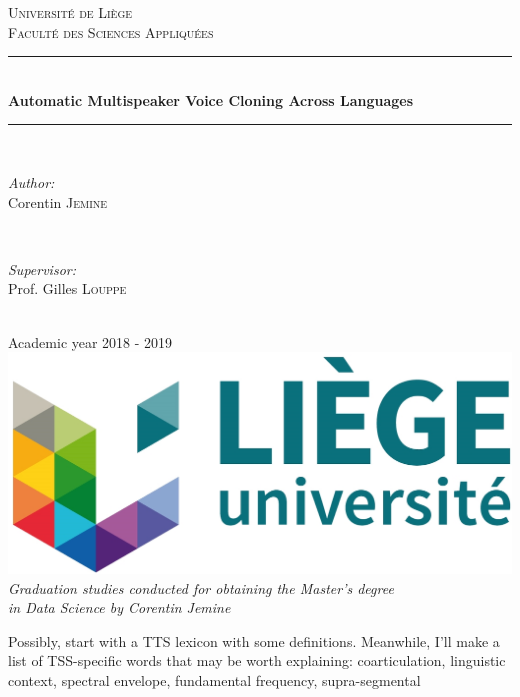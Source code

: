 \documentclass[a4paper, oneside]{article}
\begin{document}
\begin{titlepage}
	\newcommand{\HRule}{\rule{\linewidth}{0.5mm}}
	\center
	\textsc{\LARGE Université de Liège}\\[1cm]
	\textsc{\Large Faculté des Sciences Appliquées}\\[2cm]
		
	\HRule \\[0.5cm]
	{ \huge \bfseries Automatic Multispeaker Voice Cloning Across Languages}\\[0.2cm]
	\HRule \\[3cm]

	\begin{minipage}{0.4\textwidth}
		\begin{flushleft} \Large
			\emph{Author:}\\
			Corentin \textsc{Jemine}
		\end{flushleft}
	\end{minipage}
	~
	\begin{minipage}{0.4\textwidth}
		\begin{flushright} \Large
			\emph{Supervisor:} \\
			Prof. Gilles \textsc{Louppe}
		\end{flushright}
	\end{minipage}\\[4cm]
	
	{\LARGE Academic year 2018 - 2019}\\[2cm]
	
	\includegraphics{images/uliege_logo.jpg}\\[1.25cm]
	
	\textit{Graduation studies conducted for obtaining the Master's degree \\in Data Science by Corentin Jemine}
	
	\vfill
\end{titlepage}

\setcounter{page}{2}

\color{red}
Possibly, start with a TTS lexicon with some definitions. Meanwhile, I'll make a list of TSS-specific words that may be worth explaining: coarticulation, linguistic context, spectral envelope, fundamental frequency, supra-segmental
\color{black}
\end{document}
